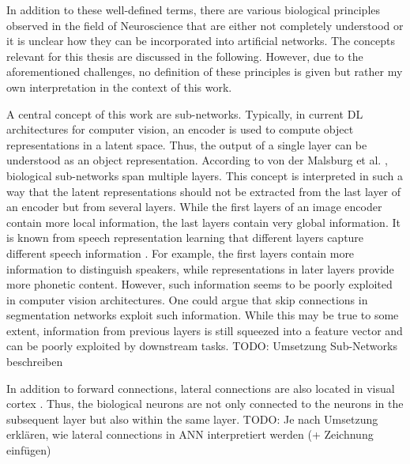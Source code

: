 In addition to these well-defined terms, there are various biological principles observed in the field of Neuroscience that are either not completely understood or it is unclear how they can be incorporated into artificial networks.
The concepts relevant for this thesis are discussed in the following.
However, due to the aforementioned challenges, no definition of these principles is given but rather my own interpretation in the context of this work.

A central concept of this work are sub-networks.
Typically, in current DL architectures for computer vision, an encoder is used to compute object representations in a latent space.
Thus, the output of a single layer can be understood as an object representation.
According to von der Malsburg et al. \cite{von_der_Malsburg_Stadelmann_Grewe_2022}, biological sub-networks span multiple layers.
This concept is interpreted in such a way that the latent representations should not be extracted from the last layer of an encoder but from several layers.
While the first layers of an image encoder contain more local information, the last layers contain very global information.
It is known from speech representation learning that different layers capture different speech information .
For example, the first layers contain more information to distinguish speakers, while representations in later layers provide more phonetic content.
However, such information seems to be poorly exploited in computer vision architectures.
One could argue that skip connections in segmentation networks  exploit such information.
While this may be true to some extent, information from previous layers is still squeezed into a feature vector and can be poorly exploited by downstream tasks.
TODO: Umsetzung Sub-Networks beschreiben

In addition to forward connections, lateral connections are also located in visual cortex .
Thus, the biological neurons are not only connected to the neurons in the subsequent layer but also within the same layer.
TODO: Je nach Umsetzung erklären, wie lateral connections in ANN interpretiert werden (+ Zeichnung einfügen)

